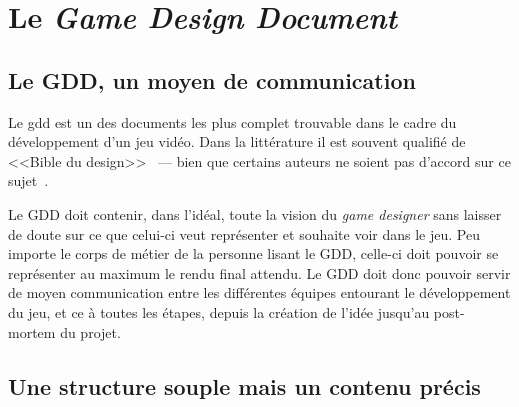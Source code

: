 \section{Le \emph{Game Design Document}}





\subsection{Le GDD, un moyen de communication}
Le \gls{gdd} est un des documents les plus complet trouvable dans le cadre du développement d'un jeu vidéo.
Dans la littérature il est souvent qualifié de <<Bible du design>>~\cite{GD_foundations_pedersen} --- bien que certains auteurs ne soient pas d'accord sur ce sujet~\cite{LevelUpRogers2014}. 

Le GDD doit contenir, dans l'idéal, toute la vision du \emph{game designer} sans laisser de doute sur ce que celui-ci veut représenter et souhaite voir dans le jeu.
Peu importe le corps de métier de la personne lisant le GDD, celle-ci doit pouvoir se représenter au maximum le rendu final attendu.
Le GDD doit donc pouvoir servir de moyen communication entre les différentes équipes entourant le développement du jeu, et ce \`a toutes les étapes, depuis la création de l'idée jusqu'au post-mortem du projet.

\subsection{Une structure souple mais un contenu précis}


